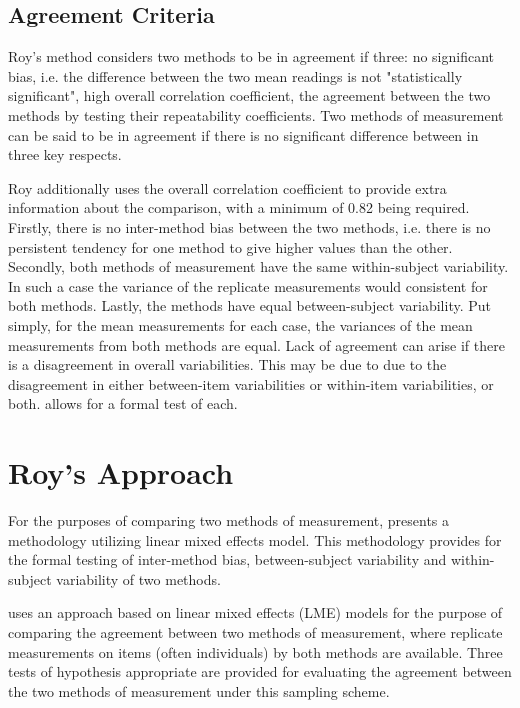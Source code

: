 \documentclass[12pt, a4paper]{report}
\theoremstyle{plain}
\theoremstyle{definition}
\theoremstyle{remark}
\begin{document}
	\subsection{Agreement Criteria}	
	Roy's method considers two methods to be in agreement if three: no significant bias, i.e. the difference between the two mean readings is not "statistically significant", high overall correlation coefficient, the agreement between the two methods by testing their
	repeatability coefficients. Two methods of measurement can be said to be in agreement if there is no significant difference between in three key respects. 
	
	Roy additionally uses the overall correlation coefficient to provide extra information about the comparison, with a minimum of 0.82 being required. Firstly, there is no inter-method bias between the two methods, i.e. there is no persistent tendency for one method to give higher values than the other. Secondly, both methods of measurement have the same  within-subject variability. In such a case the variance of the replicate measurements would consistent for both methods. Lastly, the methods have equal between-subject variability.  Put simply, for the mean measurements for each case, the variances of the mean measurements from both methods are equal. Lack of agreement can arise if there is a disagreement in overall variabilities. This may be due to due to the disagreement in either between-item variabilities or within-item variabilities, or both. \citet{ARoy2009} allows for a formal test of each.
	

	\section{Roy's Approach}
	
	For the purposes of comparing two methods of measurement, \citet{ARoy2009} presents a methodology utilizing linear mixed effects model. This methodology provides for the formal testing of inter-method bias, between-subject variability and within-subject variability of two methods. 
	
	\citet{ARoy2009} uses an approach based on linear mixed effects (LME) models for the purpose of comparing the agreement between two methods of measurement, where replicate measurements on items (often individuals) by both methods are available. Three tests of hypothesis appropriate are provided for evaluating the agreement between the two methods of measurement under this sampling scheme. 
	
\end{document}
